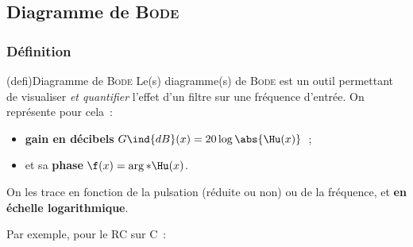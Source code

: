 \documentclass[../../main/main.tex]{subfiles}
\begin{document}
\subsection{Diagramme de \textsc{Bode}}

\subsubsection{Définition}
\begin{tcb*}(defi){Diagramme de \textsc{Bode}}
	Le(s) diagramme(s) de \textsc{Bode} est un outil permettant de visualiser
	\textit{et quantifier} l'effet d'un filtre sur une fréquence d'entrée. On
	représente pour cela~:
	\begin{itemize}
		\item \textbf{gain en décibels} $G\ind{dB}(x) = 20 \log \abs{\Hu(x)}$~;
		\item et sa \textbf{phase} $\f(x) = \arg*{{\Hu(x}})$.
	\end{itemize}
	\smallbreak
	On les trace en fonction de la pulsation (réduite ou non) ou de la fréquence,
	et \textbf{en échelle logarithmique}.
\end{tcb*}
Par exemple, pour le RC sur C~:
\end{document}

